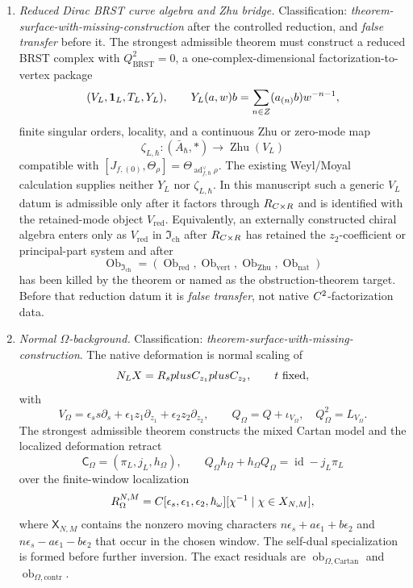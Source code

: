 \begin{enumerate}
  \item \emph{Reduced Dirac BRST curve algebra and Zhu bridge.}
  Classification: \emph{theorem-surface-with-missing-construction} after
  the controlled reduction, and \emph{false transfer} before it.  The
  strongest admissible theorem must construct a reduced BRST complex
  with \(Q_{\mathrm{BRST}}^2=0\), a one-complex-dimensional
  factorization-to-vertex package
  \[
    (V_L,\mathbf 1_L,T_L,Y_L),
    \qquad
    Y_L(a,w)b=\sum_{n\in Z}(a_{(n)}b)w^{-n-1},
  \]
  finite singular orders, locality, and a continuous Zhu or zero-mode map
  \[
    \zeta_{L,\hbar}\colon(\bar A_\hbar,*)\to\operatorname{Zhu}(V_L)
  \]
  compatible with
  \([J_{f,(0)},\Theta_\rho]
  =\Theta_{\operatorname{ad}^{\vee}_{f,\hbar}\rho}\).  The existing
  Weyl/Moyal calculation supplies neither \(Y_L\) nor \(\zeta_{L,\hbar}\).
  In this manuscript such a generic \(V_L\) datum is admissible only after
  it factors through \(R_{C\times R}\) and is identified with
  the retained-mode object \(V_{\mathrm{red}}\).
  Equivalently, an externally constructed chiral algebra enters only as
  \(V_{\mathrm{red}}\) in
  \(\mathfrak I_{\mathrm{ch}}\) after
  \(R_{C\times R}\) has retained the \(z_2\)-coefficient or
  principal-part system and after
  \[
    \operatorname{Ob}_{\mathfrak I_{\mathrm{ch}}}
    =
    (\operatorname{Ob}_{\mathrm{red}},
     \operatorname{Ob}_{\mathrm{vert}},
     \operatorname{Ob}_{\mathrm{Zhu}},
     \operatorname{Ob}_{\mathrm{nat}})
  \]
  has been killed by the theorem or named as the obstruction-theorem
  target.  Before that reduction datum it is \emph{false transfer}, not
  native \(C^2\)-factorization data.

  \item \emph{Normal \(\Omega\)-background.}
  Classification: \emph{theorem-surface-with-missing-construction}.
  The native deformation is normal scaling of
  \[
    N_LX=R_splusC_{z_1}plusC_{z_2},
    \qquad t\ \text{fixed},
  \]
  with
  \[
    V_\Omega=\epsilon_s s\partial_s+
    \epsilon_1z_1\partial_{z_1}+\epsilon_2z_2\partial_{z_2},
    \qquad
    Q_\Omega=Q+\iota_{V_\Omega},\quad
    Q_\Omega^2=L_{V_\Omega}.
  \]
  The strongest admissible theorem constructs the mixed Cartan model and
  the localized deformation retract
  \[
    \mathsf C_\Omega=(\pi_L,j_L,h_\Omega),\qquad
    Q_\Omega h_\Omega+h_\Omega Q_\Omega=\operatorname{id}-j_L\pi_L
  \]
  over the finite-window localization
  \[
    R_\Omega^{N,M}
    =
    C[\epsilon_s,\epsilon_1,\epsilon_2,\hbar_\omega]
    [\chi^{-1}\mid\chi\in X_{N,M}],
  \]
  where \(\mathsf X_{N,M}\) contains the nonzero moving characters
  \(n\epsilon_s+a\epsilon_1+b\epsilon_2\) and
  \(n\epsilon_s-a\epsilon_1-b\epsilon_2\) that occur in the chosen
  window.  The self-dual specialization is formed before further
  inversion.  The exact residuals are
  \(\operatorname{ob}_{\Omega,\mathrm{Cartan}}\) and
  \(\operatorname{ob}_{\Omega,\mathrm{contr}}\).


\end{enumerate}
